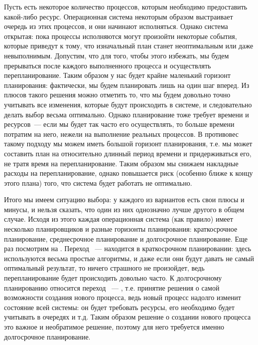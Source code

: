 Пусть есть некоторое количество процессов, которым необходимо предоставить
какой-либо ресурс. Операционная система некоторым образом выстраивает очередь из
этих процессов, и они начинают исполняться. Однако система открытая: пока
процессы исполняются могут произойти некоторые события, которые приведут к тому,
что изначальный план станет неоптимальным или даже невыполнимым. Допустим, что
для того, чтобы этого избежать, мы будем прерываться после каждого выполненного
процесса и осуществлять перепланирование. Таким образом у нас будет крайне
маленький горизонт планирования: фактически, мы будем планировать лишь на один
шаг вперед. Из плюсов такого решения можно отметить то, что мы будем довольно
точно учитывать все изменения, которые будут происходить в системе, и
следовательно делать выбор весьма оптимально. Однако планирование тоже требует
времени и ресурсов~--- если мы будет так часто его осуществлять, то больше
времени потратим на него, нежели на выполнение реальных процессов. В противовес
такому подходу мы можем иметь большой горизонт планирования, т.е. мы может
составить план на относительно длинный период времени и придерживаться его, не
тратя время на перепланирование. Таким образом мы снижаем накладные расходы на
перепланирование, однако повышается риск (особенно ближе к концу этого плана)
того, что система будет работать не оптимально.

Итого мы имеем ситуацию выбора: у каждого из вариантов есть свои плюсы и минусы,
и нельзя сказать, что один из них однозначно лучше другого в общем случае.
Исходя из этого каждая операционная система (как правило) имеет несколько
планировщиков и разные горизонты планирования: краткосрочное планирование,
среднесрочное планирование и долгосрочное планирование. Еще раз посмотрим на
. Переход ~---  находится в
краткосрочном планировании: здесь используются весьма простые алгоритмы, и даже
если они будут давать не самый оптимальный результат, то ничего страшного не
произойдет, ведь перепланирование будет происходить довольно часто. К
долгосрочному планированию относится переход ~--- ,
т.е. принятие решения о самой возможности создания нового процесса, ведь новый
процесс надолго изменит состояние всей системы: он будет требовать ресурсы, его
необходимо будет учитывать в очередях и т.д. Таким образом решение о создании
нового процесса это важное и необратимое решение, поэтому для него требуется
именно долгосрочное планирование.

